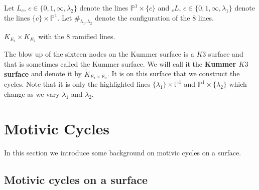 \documentclass[11pt,a4paper]{article}
\newcommand {\CP}{{\mathds P}}
\newcommand {\TK}{{\tilde{K}}}
\newcommand {\lb}{{\lambda}}
\begin{document}
Let $L_c$, $c\in \{0,1,\infty,\lb_2\}$ denote the lines $\CP^1 \times \{c\}$ and ${}_cL$, $c \in \{0,1,\infty,\lb_1\}$ denote the lines $\{c\} \times \CP^1$. Let $\#_{\lb_1,\lb_2}$ denote the configuration of the 8 lines. 

\begin{center}
	

$K_{E_1}\times K_{E_2}$ with the 8 ramified lines. 

\end{center}


The blow up of the sixteen nodes on the Kummer surface is a $K3$ surface and that is sometimes called the Kummer surface. We will call it the {\bf Kummer $K3$ surface} and denote it by $\TK_{E_1\times E_2}$. It is on this surface that we construct the cycles. Note that it is only the highlighted lines $\{\lb_1\} \times \CP^1$ and $\CP^1 \times \{\lb_2\}$ which change as we vary $\lb_1$ and $\lb_2$. 

\section{Motivic Cycles}

In this section we introduce some background on motivic cycles on a surface. 





\subsection{Motivic cycles on a surface} 
\end{document}
